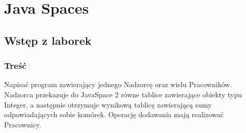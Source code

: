 \newpage

\section{Java Spaces}
	\subsection{Wstęp z laborek}
		\subsubsection{Treść}
			Napisać program zawierający jednego Nadzorcę oraz wielu Pracowników. Nadzorca przekazuje do JavaSpace 2 równe tablice zawierające obiekty typu Integer, a następnie otrzymuje wynikową tablicę zawierającą sumy odpowiadających sobie komórek. Operację dodawania mają realizować Pracownicy.
